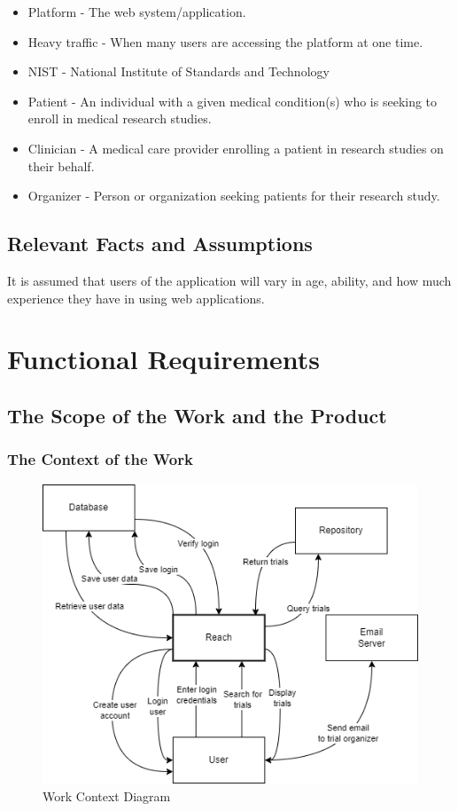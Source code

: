\documentclass[12pt, titlepage]{article}
\begin{document}
\begin{itemize}
    \item Platform - The web system/application.
    \item Heavy traffic - When many users are accessing the platform at one time.
    \item NIST - National Institute of Standards and Technology
    \item Patient - An individual with a given medical condition(s) who is seeking to enroll in medical research studies.
    \item Clinician - A medical care provider enrolling a patient in research studies on their behalf.
    \item Organizer - Person or organization seeking patients for their research study.
\end{itemize}

\subsection{Relevant Facts and Assumptions}

It is assumed that users of the application will vary in age, ability, and how much experience they have in using web applications. 

\section{Functional Requirements}

\subsection{The Scope of the Work and the Product}

\subsubsection{The Context of the Work}
\begin{figure}[H]
\centering
\includegraphics[scale=0.7]{Context.png}
\caption{Work Context Diagram}
\end{figure}
\end{document}
